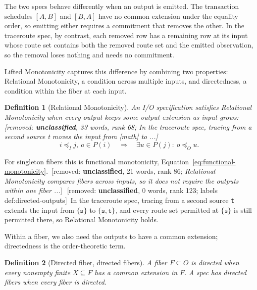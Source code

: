 \documentclass[sigconf]{cidr-2027}
\newtheorem{definition}{Definition}
\theoremstyle{remark}
\newcommand{\InputOrd}{\preceq_I}
\newcommand{\OutputOrd}{\preceq_O}
\newcommand{\commitment}{commitment\xspace}
\newcommand{\ingrows}{grows\xspace}          %
\newcommand{\outnoun}{output extension\xspace}%
\newcommand{\spectype}[1][]{I/O specification#1\xspace}
\newcommand{\fiber}[1]{P(#1)}
\newcommand{\removednote}[1]{{\color{cutred}\footnotesize\,[removed: #1]\,}}
\begin{document}
The two specs behave differently when an output is emitted. \textcolor{newblue}{The transaction
schedules $[A,B]$ and $[B,A]$ have no common extension under the equality order, so emitting either requires a
\commitment that removes the other.} \textcolor{newblue}{In the traceroute spec, by contrast, each
removed row has a remaining row at its input whose route set contains both the
removed route set and the emitted observation, so the removal loses nothing and
needs no \commitment.}

Lifted Monotonicity captures this difference by combining two properties:
Relational Monotonicity, a condition across multiple inputs, and directedness,
a condition within the fiber at each input.

\begin{definition}[Relational Monotonicity]
\label{def:relational-monotonicity}
An \spectype satisfies \emph{Relational Monotonicity}
when every output keeps some \outnoun as input \ingrows: \removednote{\textbf{unclassified}, 33 words, rank 68; \textit{In the traceroute spec, tracing from a second source t moves the input from [math] to ...}}
        \begin{equation}
  i\InputOrd j,\ o\in\fiber{i}
  \quad\Longrightarrow\quad
  \exists u\in\fiber{j}:\ o\OutputOrd u.
  \label{eq:relational-monotonicity}
        \end{equation}
\end{definition}

For singleton fibers this is functional monotonicity,
Equation~\ref{eq:functional-monotonicity}. \removednote{\textbf{unclassified}, 21 words, rank 86; \textit{Relational Monotonicity compares fibers across inputs, so it does not require the outputs within one fiber ...}} \removednote{\textbf{unclassified}, 0 words, rank 123; labels def:directed-outputs} \textcolor{newblue}{In the traceroute spec, tracing from
a second source \texttt{t} extends the input from $\{\texttt{s}\}$ to
$\{\texttt{s},\texttt{t}\}$, and every route set permitted at
$\{\texttt{s}\}$ is still permitted there, so Relational Monotonicity holds.}

\textcolor{newblue}{Within a fiber, we also need the outputs to have a common extension;
directedness is the order-theoretic term.}

\begin{definition}[Directed fiber, directed fibers]
\label{def:fiber-directedness}
A fiber $F\subseteq O$ is \emph{directed} when every nonempty finite
$X\subseteq F$ has a common extension in $F$. A spec has \emph{directed
fibers} when every fiber is directed.
\end{definition}
\end{document}
